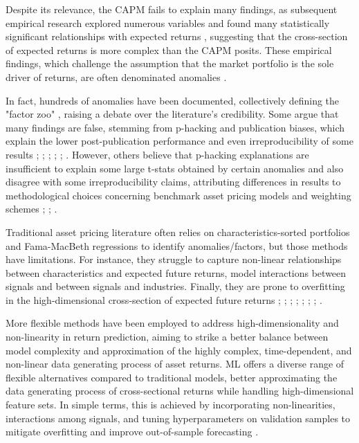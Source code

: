 \documentclass[preprint,12pt,authoryear]{elsarticle}
\begin{document}
Despite its relevance, the CAPM fails to explain many findings, as subsequent empirical research explored numerous variables and found many statistically significant relationships with expected returns \citep{greenhandzhang2013, maiti2019}, suggesting that the cross-section of expected returns is more complex than the CAPM posits. These empirical findings, which challenge the assumption that the market portfolio is the sole driver of returns, are often denominated anomalies \citep{coqueretguida2020}.

In fact, hundreds of anomalies have been documented, collectively defining the "factor zoo" \citep{cochrane2011}, raising a debate over the literature's credibility. Some argue that many findings are false, stemming from p-hacking and publication biases, which explain the lower post-publication performance and even irreproducibility of some results  \citep{harveyliuzhu2016}; \citep{harveyliu2019}; \citep{linnainmaaroberts2018}; \citep{chordiagoyalsaretto2020}; \citet{houxuezhang2017}; \citep{mcleanpontiff2016}. However, others believe that p-hacking explanations are insufficient to explain some large t-stats obtained by certain anomalies \citep{chen2022} and also disagree with some irreproducibility  claims, attributing differences in results to methodological choices concerning benchmark asset pricing models and weighting schemes \citep{jacobsmuller2020}; \citep{aghassiasnessfattouchemoskowitz2023}; \citep{jensenkellypedersen2023}. 

Traditional asset pricing literature often relies on characteristics-sorted portfolios and Fama-MacBeth regressions to identify anomalies/factors, but those methods have limitations. For instance, they struggle to capture non-linear relationships between characteristics and expected future returns, model interactions between signals and between signals and industries. Finally, they are prone to overfitting in the high-dimensional cross-section of expected future returns \citep{kellyxiu2023}; \citep{cattaneocrumpfarrellschaumburg2020}; \citep{goyal2012}; \citep{pattontimmermann2010}; \citep{romanowolf2013}; \citep{aghassiasnessfattouchemoskowitz2023}; \citep{piotroskiso2012}; \citep{asnessporterstevens2000}.

More flexible methods have been employed to address high-dimensionality and non-linearity in return prediction, aiming to strike a better balance between model complexity and approximation of the highly complex, time-dependent, and non-linear data generating process of asset returns. ML offers a diverse range of flexible alternatives compared to traditional models, better approximating the data generating process of cross-sectional returns while handling high-dimensional feature sets. In simple terms, this is achieved by incorporating non-linearities, interactions among signals, and tuning hyperparameters on validation samples to mitigate overfitting and improve out-of-sample forecasting \citep{gukellyxiu2020, kellyxiu2023, kellymalamudzhou2022}.
\end{document}
